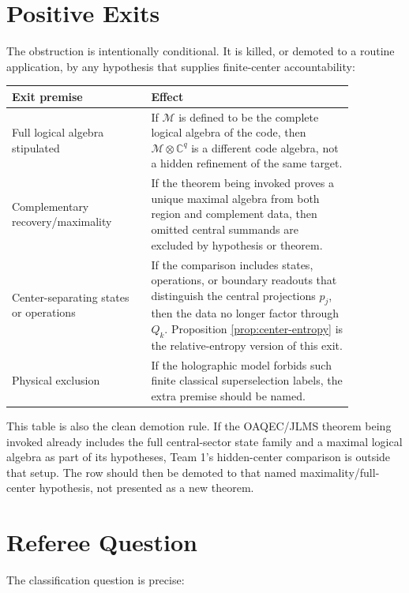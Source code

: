 \documentclass[12pt]{article}
\theoremstyle{remark}
\newcommand{\C}{\mathbb C}
\newcommand{\M}{\mathcal M}
\begin{document}
\section{Positive Exits}

The obstruction is intentionally conditional.  It is killed, or demoted to a
routine application, by any hypothesis that supplies finite-center
accountability:

\begin{center}
\begin{tabular}{>{\raggedright\arraybackslash}p{0.35\linewidth}>{\raggedright\arraybackslash}p{0.51\linewidth}}
\toprule
Exit premise & Effect \\
\midrule
Full logical algebra stipulated & If \(\M\) is defined to be the complete
logical algebra of the code, then \(\M\otimes\C^q\) is a different code
algebra, not a hidden refinement of the same target. \\
\addlinespace
Complementary recovery/maximality & If the theorem being invoked proves a
unique maximal algebra from both region and complement data, then omitted
central summands are excluded by hypothesis or theorem. \\
\addlinespace
Center-separating states or operations & If the comparison includes states,
operations, or boundary readouts that distinguish the central projections
\(p_j\), then the data no longer factor through \(Q_k\).  Proposition
\ref{prop:center-entropy} is the relative-entropy version of this exit. \\
\addlinespace
Physical exclusion & If the holographic model forbids such finite classical
superselection labels, the extra premise should be named. \\
\bottomrule
\end{tabular}
\end{center}

This table is also the clean demotion rule.  If the OAQEC/JLMS theorem being
invoked already includes the full central-sector state family and a maximal
logical algebra as part of its hypotheses, Team 1's hidden-center comparison is
outside that setup.  The row should then be demoted to that named
maximality/full-center hypothesis, not presented as a new theorem.

\section{Referee Question}

The classification question is precise:
\end{document}
